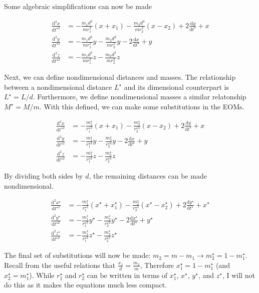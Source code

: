 \documentclass{article}
\newcommand{\dd}[2]{\frac{\mathrm{d}#1}{\mathrm{d}#2}}
\begin{document}
Some algebraic simplifications can now be made

\[\begin{aligned}
    \dd{^2x}{t^{\star2}}&=-\frac{m_1 d^3}{m r_1^3}(x+x_1)-\frac{m_2 d^3}{m r_2^3}(x-x_2)+2\dd{y}{t^\star}+x\\
    \dd{^2y}{t^{\star2}}&=-\frac{m_1 d^3}{m r_1^3}y-\frac{m_2 d^3}{m r_2^3}y-2\dd{x}{t^\star}+y\\
    \dd{^2z}{t^{\star2}}&=-\frac{m_1 d^3}{m r_1^3}z-\frac{m_2 d^3}{m r_2^3}z
\end{aligned}\]

Next, we can define nondimensional distances and masses. The relationship between a nondimensional distance $L^\star$ and its dimensional counterpart is $L^\star=L/d$. Furthermore, we define nondimensional masses a similar relatonship $M^\star=M/m$. With this defined, we can make some substitutions in the EOMs.

\[\begin{aligned}
    \dd{^2x}{t^{\star2}}&=-\frac{m_1^\star}{r_1^{\star3}}(x+x_1)-\frac{m_2^\star}{r_2^{\star3}}(x-x_2)+2\dd{y}{t^\star}+x\\
    \dd{^2y}{t^{\star2}}&=-\frac{m_1^\star}{r_1^{\star3}}y-\frac{m_2^\star}{r_2^{\star3}}y-2\dd{x}{t^\star}+y\\
    \dd{^2z}{t^{\star2}}&=-\frac{m_1^\star}{r_1^{\star3}}z-\frac{m_2^\star}{r_2^{\star3}}z
\end{aligned}\]

By dividing both sides by $d$, the remaining distances can be made nondimensional.

\[\begin{aligned}
    \dd{^2x^\star}{t^{\star2}}&=-\frac{m_1^\star}{r_1^{\star3}}(x^\star+x_1^\star)-\frac{m_2^\star}{r_2^{\star3}}(x^\star-x_2^\star)+2\dd{y^\star}{t^\star}+x^\star\\
    \dd{^2y^\star}{t^{\star2}}&=-\frac{m_1^\star}{r_1^{\star3}}y^\star-\frac{m_2^\star}{r_2^{\star3}}y^\star-2\dd{x^\star}{t^\star}+y^\star\\
    \dd{^2z^\star}{t^{\star2}}&=-\frac{m_1^\star}{r_1^{\star3}}z^\star-\frac{m_2^\star}{r_2^{\star3}}z^\star
\end{aligned}\]

The final set of substitutions will now be made: $m_2=m-m_1 \to m_2^\star=1-m_1^\star$. Recall from the useful relations that $\frac{x_1}{d}=\frac{m_2}{m}$, Therefore $x_1^\star=1-m_1^\star$ (and $x_2^\star=m_1^\star$). While $r_1^\star$ and $r_2^\star$ can be written in terms of $x_1^\star$, $x^\star$, $y^\star$, and $z^\star$, I will not do this as it makes the equations much less compact.
\end{document}
